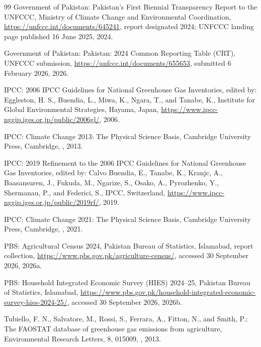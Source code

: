 \documentclass[essd,manuscript]{copernicus}
\begin{document}
\begin{thebibliography}{99}
Government of Pakistan: Pakistan's First Biennial Transparency Report to the UNFCCC, Ministry of Climate Change and Environmental Coordination, \url{https://unfccc.int/documents/645241}, report designated 2024; UNFCCC landing page published 16 June 2025, 2024.

Government of Pakistan: Pakistan: 2024 Common Reporting Table (CRT), UNFCCC submission, \url{https://unfccc.int/documents/655653}, submitted 6 February 2026, 2026.

IPCC: 2006 IPCC Guidelines for National Greenhouse Gas Inventories, edited by: Eggleston, H. S., Buendia, L., Miwa, K., Ngara, T., and Tanabe, K., Institute for Global Environmental Strategies, Hayama, Japan, \url{https://www.ipcc-nggip.iges.or.jp/public/2006gl/}, 2006.

IPCC: Climate Change 2013: The Physical Science Basis, Cambridge University Press, Cambridge, , 2013.

IPCC: 2019 Refinement to the 2006 IPCC Guidelines for National Greenhouse Gas Inventories, edited by: Calvo Buendia, E., Tanabe, K., Kranjc, A., Baasansuren, J., Fukuda, M., Ngarize, S., Osako, A., Pyrozhenko, Y., Shermanau, P., and Federici, S., IPCC, Switzerland, \url{https://www.ipcc-nggip.iges.or.jp/public/2019rf/}, 2019.

IPCC: Climate Change 2021: The Physical Science Basis, Cambridge University Press, Cambridge, , 2021.

PBS: Agricultural Census 2024, Pakistan Bureau of Statistics, Islamabad, report collection, \url{https://www.pbs.gov.pk/agriculture-census/}, accessed 30 September 2026, 2026a.

PBS: Household Integrated Economic Survey (HIES) 2024--25, Pakistan Bureau of Statistics, Islamabad, \url{https://www.pbs.gov.pk/household-integrated-economic-survey-hies-2024-25/}, accessed 30 September 2026, 2026b.

Tubiello, F. N., Salvatore, M., Rossi, S., Ferrara, A., Fitton, N., and Smith, P.: The FAOSTAT database of greenhouse gas emissions from agriculture, Environmental Research Letters, 8, 015009, , 2013.

\end{thebibliography}
\end{document}
